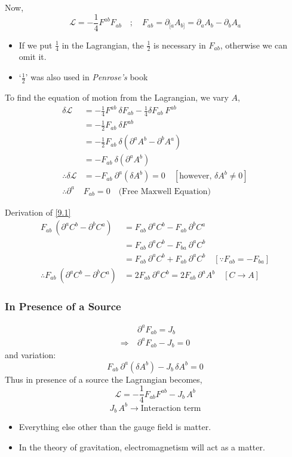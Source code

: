 \documentclass[14pt]{article} %
\begin{document}
Now, 
\[
\mathcal{L} = -\frac{1}{4} F^{ab} F_{ab} \quad;\quad F_{ab} = \partial_{[a}A_{b]} = \partial_a A_b - \partial_b A_a
\]
\begin{tcolorbox}[ proofbox, title=Note about the factor-$\frac{1}{2}$ ]
\begin{itemize}
    \item If we put $\frac{1}{4}$ in the Lagrangian, the $\frac{1}{2}$ is necessary in $F_{ab}$, otherwise we can omit it.
    \item `$\frac{1}{2}$' was also used in \textit{Penrose's} book
\end{itemize}
\end{tcolorbox}
To find the equation of motion from the Lagrangian, we vary $A$,
\begin{align*}
\delta \mathcal{L} &= -\frac{1}{4} F^{ab}~\delta F_{ab}  -\frac{1}{4} \delta F_{ab}~ F^{ab} \\
&= -\frac{1}{2} F_{ab}~ \delta F^{ab} \\
&= -\frac{1}{2} F_{ab}~\delta ( \partial^a A^b - \partial^b A^a ) \\
&= -F_{ab}~ \delta (\partial^a A^b) \tag{9.1} \label{9.1} \\
\therefore \delta \mathcal{L}&= -F_{ab}~ \partial^a (\delta A^b) =0 \quad [\text{however, } \delta A^b \ne 0] \\
\therefore \partial^a &F_{ab} = 0 \quad \text{(Free Maxwell Equation)}
\end{align*}
\begin{tcolorbox}
Derivation of \eqref{9.1}
\begin{align}
F_{ab}~(\partial^a C^b - \partial^b C^a ) &= F_{ab}~\partial^a C^b - F_{ab}~\partial^b C^a  \\
&= F_{ab}~\partial^a C^b - F_{ba}~\partial^a C^b \\
&= F_{ab}~\partial^a C^b + F_{ab}~\partial^a C^b \quad [\because F_{ab} = -F_{ba} ] \\
\therefore F_{ab}~(\partial^a C^b - \partial^b C^a ) &= 2F_{ab}~\partial^a C^b = 2F_{ab}~\partial^a A^b \quad[ C\to A ]
\end{align}
\end{tcolorbox}
\subsubsection{In Presence of a Source}
\begin{align*}
&\partial^a F_{ab} = J_b \\
\Rightarrow ~&\partial^a F_{ab} - J_b = 0
\end{align*}
and variation:
\[
F_{ab}~\partial^a (\delta A^b) - J_b \, \delta A^b = 0
\]
Thus in presence of a source the Lagrangian becomes,
\[
\mathcal{L} = -\frac{1}{4} F_{ab} F^{ab} - J_b \,A^b
\]
\[
J_b \, A^b \to \text{Interaction term}
\]
\begin{tcolorbox}[ proofbox, title=Notes ]
\begin{itemize}
    \item Everything else other than the gauge field is matter.
    \item In the theory of gravitation, electromagnetism will act as a matter.
\end{itemize}
\end{tcolorbox}
\end{document}

